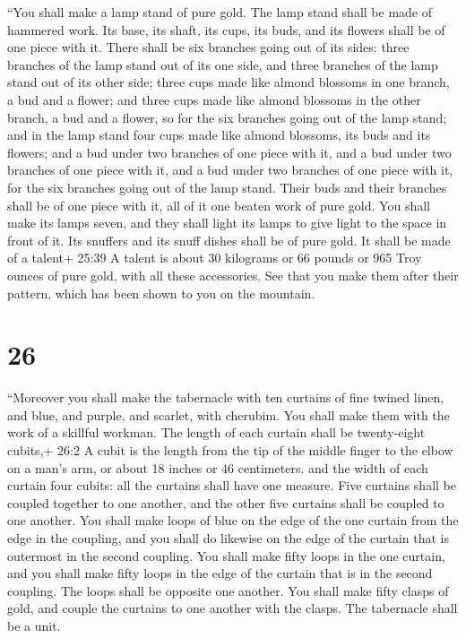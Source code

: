  ``You shall make a lamp stand of pure gold. The lamp stand
shall be made of hammered work. Its base, its shaft, its cups, its buds,
and its flowers shall be of one piece with it.  There shall
be six branches going out of its sides: three branches of the lamp stand
out of its one side, and three branches of the lamp stand out of its
other side;  three cups made like almond blossoms in one
branch, a bud and a flower; and three cups made like almond blossoms in
the other branch, a bud and a flower, so for the six branches going out
of the lamp stand;  and in the lamp stand four cups made
like almond blossoms, its buds and its flowers;  and a bud
under two branches of one piece with it, and a bud under two branches of
one piece with it, and a bud under two branches of one piece with it,
for the six branches going out of the lamp stand.  Their
buds and their branches shall be of one piece with it, all of it one
beaten work of pure gold.  You shall make its lamps seven,
and they shall light its lamps to give light to the space in front of
it.  Its snuffers and its snuff dishes shall be of pure
gold.  It shall be made of a talent+ 25:39 A talent is
about 30 kilograms or 66 pounds or 965 Troy ounces of pure gold, with
all these accessories.  See that you make them after their
pattern, which has been shown to you on the mountain.

\hypertarget{section-25}{%
\section{26}\label{section-25}}

 ``Moreover you shall make the tabernacle with ten curtains
of fine twined linen, and blue, and purple, and scarlet, with cherubim.
You shall make them with the work of a skillful workman. 
The length of each curtain shall be twenty-eight cubits,+ 26:2 A cubit
is the length from the tip of the middle finger to the elbow on a man's
arm, or about 18 inches or 46 centimeters. and the width of each curtain
four cubits: all the curtains shall have one measure.  Five
curtains shall be coupled together to one another, and the other five
curtains shall be coupled to one another.  You shall make
loops of blue on the edge of the one curtain from the edge in the
coupling, and you shall do likewise on the edge of the curtain that is
outermost in the second coupling.  You shall make fifty
loops in the one curtain, and you shall make fifty loops in the edge of
the curtain that is in the second coupling. The loops shall be opposite
one another.  You shall make fifty clasps of gold, and
couple the curtains to one another with the clasps. The tabernacle shall
be a unit.


